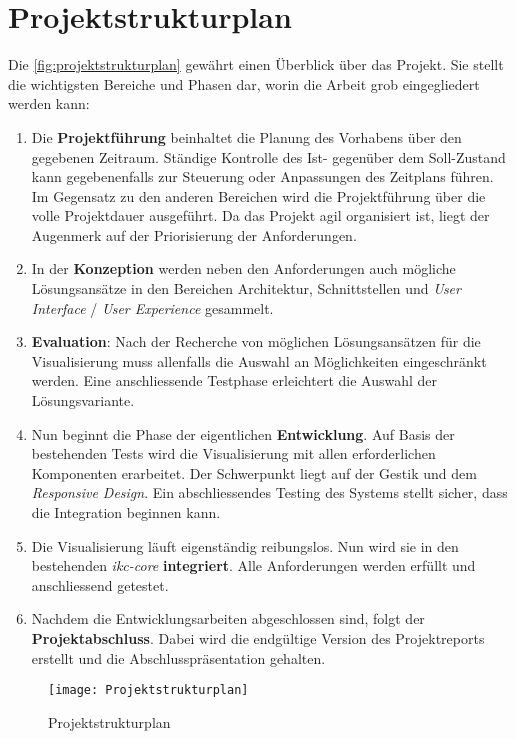 \section{Projektstrukturplan}
Die \autoref{fig:projektstrukturplan} gewährt einen Überblick über das Projekt. Sie stellt die wichtigsten Bereiche und Phasen dar, worin die Arbeit grob eingegliedert werden kann:
\begin{enumerate}
    \item Die \textbf{Projektführung} beinhaltet die Planung des Vorhabens über den gegebenen Zeitraum. Ständige Kontrolle des Ist- gegenüber dem Soll-Zustand kann gegebenenfalls zur Steuerung oder Anpassungen des Zeitplans führen. Im Gegensatz zu den anderen Bereichen wird die Projektführung über die volle Projektdauer ausgeführt. Da das Projekt agil organisiert ist, liegt der Augenmerk auf der Priorisierung der Anforderungen.
    \item In der \textbf{Konzeption} werden neben den Anforderungen auch mög\-li\-che Lösungsansätze in den Bereichen Architektur, Schnittstellen und \textit{User Interface} / \textit{User Experience} gesammelt.
    \item \textbf{Evaluation}: Nach der Recherche von möglichen Lösungsansätzen für die Visualisierung muss allenfalls die Auswahl an Mög\-li\-chkei\-ten eingeschränkt werden. Eine anschliessende Testphase erleichtert die Auswahl der Lösungsvariante.
    \item Nun beginnt die Phase der eigentlichen \textbf{Entwicklung}. Auf Basis der bestehenden Tests wird die Visualisierung mit allen erforderlichen Komponenten erarbeitet. Der Schwerpunkt liegt auf der Gestik und dem \textit{Responsive Design}. Ein abschliessendes Testing des Systems stellt sicher, dass die Integration beginnen kann.
    \item Die Visualisierung läuft eigenständig reibungslos. Nun wird sie in den bestehenden \textit{ikc-core} \textbf{integriert}. Alle Anforderungen werden erfüllt und anschliessend getestet.
    \item Nachdem die Entwicklungsarbeiten abgeschlossen sind, folgt der \textbf{Projektabschluss}. Dabei wird die endgültige Version des Projektreports erstellt und die Abschlusspräsentation gehalten.
\end{enumerate}

\newpage

\begin{landscape}
\begin{figure}[ht]
\centering
\texttt{[image: Projektstrukturplan]}
\caption{Projektstrukturplan}
\label{fig:projektstrukturplan}
\end{figure}
\end{landscape}


